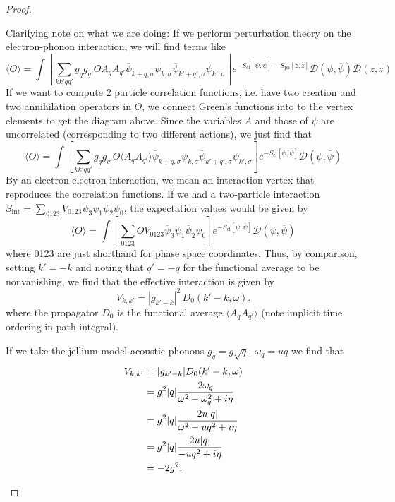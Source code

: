 \begin{proof}
\begin{parts}
Clarifying note on what we are doing: If we perform perturbation theory on the electron-phonon interaction, we will find terms like
\[\langle O\rangle = \int\left[\sum_{kk'qq'} g_q g_{q'}OA_q A_{q'}\overline{\psi}_{k+q,\sigma}\psi_{k,\sigma}\overline{\psi}_{k'+q',\sigma}\psi_{k',\sigma}\right]e^{-S_\text{el}[\psi,\overline{\psi}]-S_\text{ph}[z,\overline{z}]}\mathcal{D}(\psi,\overline{\psi}) \mathcal{D}(z,\overline{z})\]
If we want to compute 2 particle correlation functions, i.e. have two creation and two annihilation operators in $O$, we connect Green's functions into to the vertex elements to get the diagram above. Since the variables $A$ and those of $\psi$ are uncorrelated (corresponding to two different actions), we just find that
\[
\langle O\rangle = \int\left[\sum_{kk'qq'} g_q g_{q'}O\langle A_q A_{q'}\rangle\overline{\psi}_{k+q,\sigma}\psi_{k,\sigma}\overline{\psi}_{k'+q',\sigma}\psi_{k',\sigma}\right]e^{-S_\text{el}[\psi,\overline{\psi}]}\mathcal{D}(\psi,\overline{\psi})
\]
By an electron-electron interaction, we mean an interaction vertex that reproduces the correlation functions. If we had a two-particle interaction $S_\text{int} = \sum_{0123}V_{0123}\overline{\psi}_3\psi_1\overline{\psi}_2\psi_0$, the expectation values would be given by
\[\langle O\rangle = \int \left[\sum_{0123} OV_{0123}\overline{\psi}_3\psi_1\overline{\psi}_2\psi_0\right] e^{-S_\text{el}[\psi,\overline{\psi}]}\mathcal{D}(\psi,\overline{\psi})\]
where 0123 are just shorthand for phase space coordinates. Thus, by comparison, setting $k'=-k$ and noting that $q'=-q$ for the functional average to be nonvanishing, we find that the effective interaction is given by
\[
V_{k,k'} = |g_{k'-k}|^2 \, D_0(k' - k, \omega).
\]
where the propagator $D_0$ is the functional average $\langle A_q A_{q'}\rangle$ (note implicit time ordering in path integral).

If we take the jellium model acoustic phonons $g_q =g\sqrt{q},~\omega_q = uq$ we find that
\begin{align*}
	V_{k,k'} &= |g_{k'-k}|D_0(k'-k,\omega) \\
	&= g^2 |q| \frac{2\omega_q}{\omega^2 - \omega_q^2 + i\eta}\\
	&= g^2 |q| \frac{2u |q|}{\omega^2 - u q^2 + i\eta}\\
	&= g^2 |q| \frac{2u |q|}{-u q^2 + i\eta}\\
	&= -2g^2.\qedhere
\end{align*}
	\end{parts}
\end{proof}
